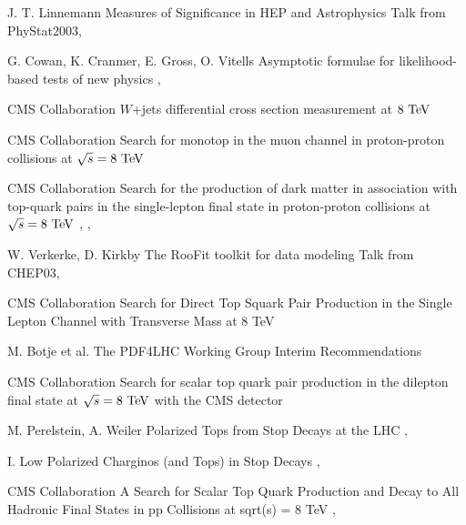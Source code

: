 {J. T. Linnemann}
{Measures of Significance in HEP and Astrophysics}
{Talk from PhyStat2003, }

{G. Cowan, K. Cranmer, E. Gross, O. Vitells}
{Asymptotic formulae for likelihood-based tests of new physics}
{, }


{CMS Collaboration}
{$W$+jets differential cross section measurement at $8~\text{TeV}$}
{}

{CMS Collaboration}
{Search for monotop in the muon channel in proton-proton collisions at $\sqrt{s} = 8~\text{TeV}$}
{}

{CMS Collaboration}
{Search for the production of dark matter in association with top-quark pairs
in the single-lepton final state in proton-proton collisions at $\sqrt{s} = 8~\text{TeV}$}
{, , }

{W. Verkerke, D. Kirkby}
{The RooFit toolkit for data modeling}
{Talk from CHEP03, }


{CMS Collaboration}
{Search for Direct Top Squark Pair Production in the Single Lepton Channel
with Transverse Mass at 8 TeV}
{}

{M. Botje et al.}
{The PDF4LHC Working Group Interim Recommendations}
{}


{CMS Collaboration}
{Search for scalar top quark pair production in the dilepton
final state at $\sqrt{s} = 8~\text{TeV}$ with the CMS detector}
{}

{M. Perelstein, A. Weiler}
{Polarized Tops from Stop Decays at the LHC}
{, }

{I. Low}
{Polarized Charginos (and Tops) in Stop Decays}
{, }

{CMS Collaboration}
{A Search for Scalar Top Quark Production and Decay to All Hadronic Final States in pp Collisions at sqrt(s) = 8 TeV}
{, }

